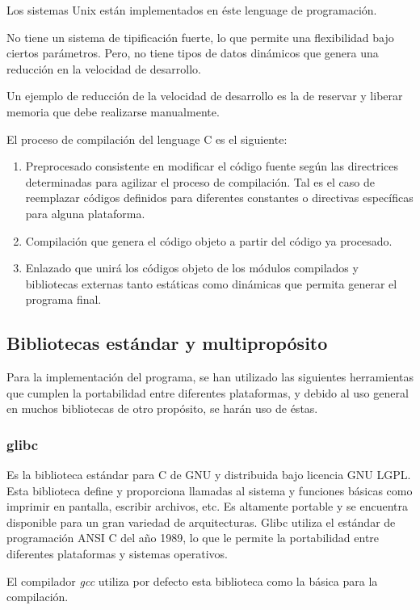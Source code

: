 \documentclass[letterpaper,10pt]{article}
\begin{document}
Los sistemas Unix están implementados en éste lenguage de programación.

No tiene un sistema de tipificación fuerte, lo que permite una flexibilidad bajo ciertos parámetros.
Pero, no tiene tipos de datos dinámicos que genera una reducción en la velocidad de desarrollo.

Un ejemplo de reducción de la velocidad de desarrollo es la de reservar y liberar memoria que debe realizarse
manualmente.

El proceso de compilación del lenguage C es el siguiente: 
\begin{enumerate}
  \item Preprocesado consistente en modificar el código fuente según las directrices determinadas para agilizar
    el proceso de compilación. Tal es el caso de reemplazar códigos definidos para diferentes constantes o
    directivas específicas para alguna plataforma.
  \item Compilación que genera el código objeto a partir del código ya procesado.
  \item Enlazado que unirá los códigos objeto de los módulos compilados y bibliotecas externas tanto estáticas
    como dinámicas que permita generar el programa final.

\end{enumerate}

\subsection{Bibliotecas estándar y multipropósito}
Para la implementación del programa, se han utilizado las siguientes herramientas que cumplen la portabilidad
entre diferentes plataformas, y debido al uso general en muchos bibliotecas de otro propósito, se harán
uso de éstas.
\subsubsection{glibc} Es la biblioteca estándar para C de GNU y distribuida bajo licencia GNU LGPL.
Esta biblioteca define y proporciona llamadas al sistema y funciones básicas como imprimir en pantalla,
escribir archivos, etc. Es altamente portable y se encuentra disponible para un gran variedad de 
arquitecturas. Glibc utiliza el estándar de programación ANSI C del año 1989, lo que le permite la portabilidad
entre diferentes plataformas y sistemas operativos.

El compilador \emph{gcc} utiliza por defecto esta biblioteca como la básica para la compilación.
\end{document}
